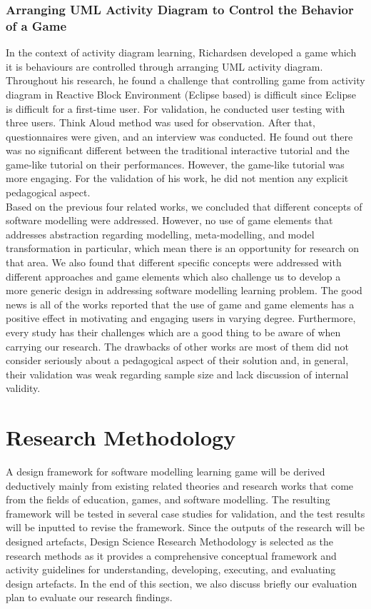 \documentclass[12pt, a4paper]{report}
\begin{document}
\subsubsection{Arranging UML Activity Diagram to Control the Behavior of a Game}
In the context of activity diagram learning, Richardsen \cite{Richardsen2014} developed a game which it is behaviours are controlled through arranging UML activity diagram. Throughout his research, he found a challenge that controlling game from activity diagram in Reactive Block Environment (Eclipse based) is difficult since Eclipse is difficult for a first-time user. For validation, he conducted user testing with three users. Think Aloud method was used for observation. After that, questionnaires were given, and an interview was conducted. He found out there was no significant different between the traditional interactive tutorial and the game-like tutorial on their performances. However, the game-like tutorial was more engaging. For the validation of his work, he did not mention any explicit pedagogical aspect.\\

Based on the previous four related works, we concluded that different concepts of software modelling were addressed. However, no use of game elements that addresses abstraction regarding modelling, meta-modelling, and model transformation in particular, which mean there is an opportunity for research on that area. We also found that different specific concepts were addressed with different approaches and game elements which also challenge us to develop a more generic design in addressing software modelling learning problem. The good news is all of the works reported that the use of game and game elements has a positive effect in motivating and engaging users in varying degree. Furthermore, every study has their challenges which are a good thing to be aware of when carrying our research. The drawbacks of other works are most of them did not consider seriously about a pedagogical aspect of their solution and, in general, their validation was weak regarding sample size and lack discussion of internal validity.

\section{Research Methodology}
A design framework for software modelling learning game will be derived deductively mainly from existing related theories and research works that come from the fields of education, games, and software modelling. The resulting framework will be tested in several case studies for validation, and the test results will be inputted to revise the framework. Since the outputs of the research will be designed artefacts, Design Science Research Methodology \cite{peffers2007design} is selected as the research methods as it provides a comprehensive conceptual framework and activity guidelines for understanding, developing, executing, and evaluating design artefacts. In the end of this section, we also discuss  briefly our evaluation plan to evaluate our research findings.  
\end{document}
